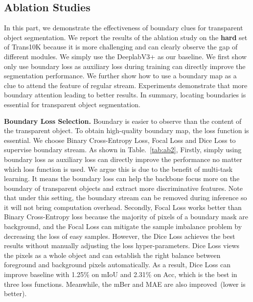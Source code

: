 \documentclass[runningheads]{llncs}
\begin{document}
{    \subsection{Ablation Studies}
    In this part, we demonstrate the effectiveness of boundary clues for transparent object segmentation.
    We report the results of the ablation study on the \textbf{hard} set of Trans10K because it is more challenging and can clearly observe the gap of different modules.
    We simply use the DeeplabV3+ as our baseline.
    We first show only use boundary loss as auxiliary loss during training can directly improve the segmentation performance.
    We further show how to use a boundary map as a clue to attend the feature of regular stream. Experiments demonstrate that more boundary attention leading to better results. In summary, locating boundaries is essential for transparent object segmentation.

    \textbf{Boundary Loss Selection.}
    Boundary is easier to observe than the content of the transparent object.
    To obtain high-quality boundary map, the loss function is essential.
    We choose Binary Cross-Entropy Loss, Focal Loss and Dice Loss to supervise boundary stream.
    As shown in Table.~\ref{tab:ab2}, Firstly, simply using boundary loss as auxiliary loss can directly improve the performance no matter which loss function is used. We argue this is due to the benefit of multi-task learning. It means the boundary loss can help the backbone focus more on the boundary of transparent objects and extract more discriminative features. Note that under this setting, the boundary stream can be removed during inference so it will not bring computation overhead.
    Secondly, Focal Loss works better than Binary Cross-Entropy loss because the majority of pixels of a boundary mask are background, and the Focal Loss can mitigate the sample imbalance problem by decreasing the loss of easy samples. However, the Dice Loss achieves the best results without manually adjusting the loss hyper-parameters. Dice Loss views the pixels as a whole object and can establish the right balance between foreground and background pixels automatically. As a result, Dice Loss can improve baseline with 1.25\% on mIoU and 2.31\% on Acc, which is the best in three loss functions. Meanwhile, the mBer and MAE are also improved~(lower is better).



}
\end{document}
